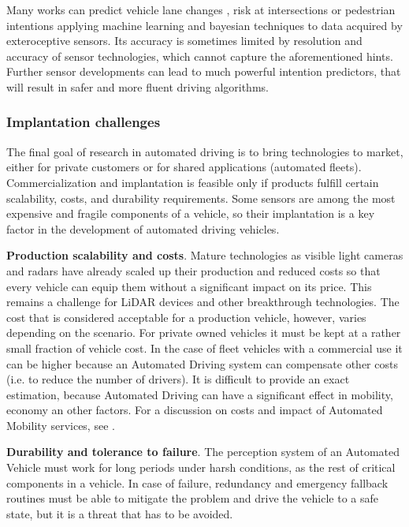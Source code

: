     Many works can predict vehicle lane changes \cite{Kim2017}, risk at
    intersections \cite{Lefevre2012} or pedestrian intentions
    \cite{Kohler2015,Fang2017} applying machine learning and bayesian
    techniques to data acquired by exteroceptive sensors. Its accuracy 
    is sometimes limited by resolution and accuracy of sensor technologies,
    which cannot capture the aforementioned hints.
    Further sensor developments can lead to much powerful intention 
    predictors, that will result in safer and more fluent driving 
    algorithms.
    


\subsubsection{Implantation challenges}

The final goal of research in automated driving is to bring technologies to
market, either for private customers or for shared applications (automated 
fleets). Commercialization and implantation is feasible only if products 
fulfill certain scalability, costs, and durability requirements. 
Some sensors are among the most expensive and fragile components of a vehicle,
so their implantation is a key factor in the development of automated driving
vehicles.

\textbf{Production scalability and costs}. 
Mature technologies as visible light cameras and radars have already scaled up 
their production and reduced costs so that every vehicle can equip them without
a significant impact on its price. This remains a challenge for LiDAR devices
and other breakthrough technologies.
The cost that is considered acceptable for a production vehicle, however, 
varies depending on the scenario. For private owned vehicles it must be kept at 
a rather small fraction of vehicle cost. In the case of fleet vehicles with a 
commercial use it can be higher because an Automated Driving system can 
compensate other costs (i.e. to reduce the number of drivers).
It is difficult to provide an exact estimation, because Automated Driving can 
have a significant effect in mobility, economy an other factors. 
For a discussion on costs and impact of Automated Mobility services, see
\cite{Bosch2018}.

\textbf{Durability and tolerance to failure}.
The perception system of an Automated Vehicle must work for long
periods under harsh conditions, as the rest of critical components in a vehicle.
In case of failure, redundancy and emergency fallback routines must be able to 
mitigate the problem and drive the vehicle to a safe state, but it is a 
threat that has to be avoided.

